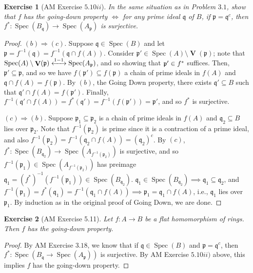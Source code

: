 \documentclass[12pt,letterpaper]{article}
\newtheorem{problem}{Exercise}[section]
\theoremstyle{definition}
\theoremstyle{remark}
\numberwithin{figure}{problem}
\numberwithin{equation}{section}
\let\Im\relax
\DeclareMathOperator{\Im}{Im}
\DeclareMathOperator{\Spec}{Spec}
\DeclareMathOperator{\V}{\mathbf{V}}
\begin{document}
\begin{problem}[AM Exercise $5.10ii$]
  In the same situation as in Problem $3.1$, show that $f$ has the going-down property $\iff$ for any prime ideal $\mathfrak{q}$ of $B$, if $\mathfrak{p} = \mathfrak{q}^c$, then $f^*:\Spec(B_\mathfrak{q}) \to \Spec(A_\mathfrak{p})$ is surjective.
\end{problem}
\begin{proof}
  $(b) \Rightarrow (c)$. Suppose $\mathfrak{q} \in \Spec(B)$ and let $\mathfrak{p} = f^{-1}(\mathfrak{q}) = f^{-1}(\mathfrak{q} \cap f(A))$. Consider $\mathfrak{p}' \in \Spec(A) \setminus \V(\mathfrak{p})$; note that $\Spec(A) \setminus \V(\mathfrak{p}) \xleftrightarrow{1-1\:} \Spec(A_\mathfrak{p})$, and so showing that $\mathfrak{p}' \in \Im f^*$ suffices. Then, $\mathfrak{p}' \subseteq \mathfrak{p}$, and so we have $f(\mathfrak{p}') \subseteq f(\mathfrak{p})$ a chain of prime ideals in $f(A)$ and $\mathfrak{q} \cap f(A) = f(\mathfrak{p})$. By $(b)$, the Going Down property, there exists $\mathfrak{q}' \subseteq B$ such that $\mathfrak{q}' \cap f(A) = f(\mathfrak{p}')$. Finally, $f^{-1}(\mathfrak{q}' \cap f(A)) = f^*(\mathfrak{q}') = f^{-1}(f(\mathfrak{p}')) = \mathfrak{p}'$, and so $f^*$ is surjective.
  \par $(c) \Rightarrow (b)$. Suppose $\mathfrak{p}_1 \subseteq \mathfrak{p}_2$ is a chain of prime ideals in $f(A)$ and $\mathfrak{q}_2 \subseteq B$ lies over $\mathfrak{p}_2$. Note that $f^{-1}(\mathfrak{p}_2)$ is prime since it is a contraction of a prime ideal, and also $f^{-1}(\mathfrak{p}_2) = f^{-1}(\mathfrak{q}_2 \cap f(A)) = (\mathfrak{q}_2)^c$. By $(c)$, $f^* : \Spec(B_{\mathfrak{q}_2}) \to \Spec(A_{f^{-1}(\mathfrak{p}_2)})$ is surjective, and so $f^{-1}(\mathfrak{p}_1) \in \Spec(A_{f^{-1}(\mathfrak{p}_2)})$ has preimage $\mathfrak{q}_1 = (f^*)^{-1}(f^{-1}(\mathfrak{p}_1)) \in \Spec(B_{\mathfrak{q}_2})$. $\mathfrak{q}_1 \in \Spec(B_{\mathfrak{q}_2}) \implies \mathfrak{q}_1 \subseteq \mathfrak{q}_2$, and $f^{-1}(\mathfrak{p}_1) = f^*(\mathfrak{q}_1) = f^{-1}(\mathfrak{q}_1 \cap f(A)) \implies \mathfrak{p}_1 = \mathfrak{q}_1 \cap f(A)$, i.e., $\mathfrak{q}_1$ lies over $\mathfrak{p}_1$. By induction as in the original proof of Going Down, we are done.
\end{proof}

\begin{problem}[AM Exercise 5.11]
  Let $f: A \to B$ be a flat homomorphism of rings. Then $f$ has the going-down property.
\end{problem}
\begin{proof}
  By AM Exercise $3.18$, we know that if $\mathfrak{q} \in \Spec(B)$ and $\mathfrak{p} = \mathfrak{q}^c$, then $f^* : \Spec(B_\mathfrak{q} \to \Spec(A_\mathfrak{p}))$ is surjective. By AM Exercise $5.10ii)$ above, this implies $f$ has the going-down property.
\end{proof}
\end{document}

